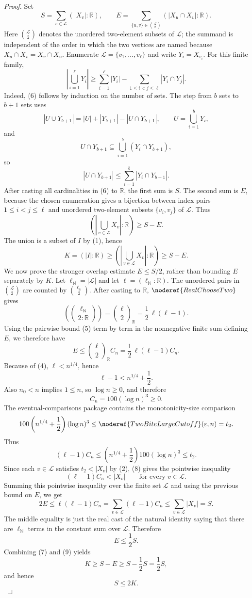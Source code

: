 \begin{proof}
Set
\[
S=\sum_{v\in\mathcal L}(|X_v|:\mathbb R),
\qquad
E=\sum_{\{u,v\}\in\binom{\mathcal L}{2}}
  (|X_u\cap X_v|:\mathbb R).
\]
Here \(\binom{\mathcal L}{2}\) denotes the unordered two-element subsets of
\(\mathcal L\); the summand is independent of the order in which the two
vertices are named because \(X_u\cap X_v=X_v\cap X_u\).
Enumerate \(\mathcal L=\{v_1,\ldots,v_\ell\}\) and write
\(Y_i=X_{v_i}\).  For this finite family,
\[
\left|\bigcup_{i=1}^{\ell}Y_i\right|
\ge
\sum_{i=1}^{\ell}|Y_i|
-
\sum_{1\le i<j\le \ell}|Y_i\cap Y_j|. \tag{6}
\]
Indeed, (6) follows by induction on the number of sets.  The step from
\(b\) sets to \(b+1\) sets uses
\[
|U\cup Y_{b+1}|=|U|+|Y_{b+1}|-|U\cap Y_{b+1}|,
\qquad U=\bigcup_{i=1}^{b}Y_i,
\]
and
\[
U\cap Y_{b+1}\subseteq
\bigcup_{i=1}^{b}(Y_i\cap Y_{b+1}),
\]
so
\[
|U\cap Y_{b+1}|
\le
\sum_{i=1}^{b}|Y_i\cap Y_{b+1}|.
\]
After casting all cardinalities in (6) to \(\mathbb R\), the first sum is
\(S\).  The second sum is \(E\), because the chosen enumeration gives a
bijection between index pairs \(1\le i<j\le\ell\) and unordered two-element
subsets \(\{v_i,v_j\}\) of \(\mathcal L\).  Thus
\[
\left(\left|\bigcup_{v\in\mathcal L}X_v\right|:\mathbb R\right)\ge S-E.
\]
The union is a subset of \(I\) by (1), hence
\[
K=(|I|:\mathbb R)\ge
\left(\left|\bigcup_{v\in\mathcal L}X_v\right|:\mathbb R\right)
\ge S-E. \tag{7}
\]
We now prove the stronger overlap estimate \(E\le S/2\), rather than bounding
\(E\) separately by \(K\).  Let \(\ell_{\mathbb N}=|\mathcal L|\) and let
\(\ell=(\ell_{\mathbb N}:\mathbb R)\).  The unordered pairs in
\(\binom{\mathcal L}{2}\) are counted by \(\ell_{\mathbb N}\choose 2\).  After
casting to \(\mathbb R\), \(\noderef{RealChooseTwo}\) gives
\[
(\ell_{\mathbb N}\choose 2:\mathbb R)
=\binom{\ell}{2}_{\mathbb R}
=\frac12\,\ell(\ell-1).
\]
Using the pairwise bound (5) term by term in the nonnegative finite sum
defining \(E\), we therefore have
\[
E\le \binom{\ell}{2}_{\mathbb R}C_n
=\frac12\,\ell(\ell-1)C_n.
\]
Because of (4), \(\ell<n^{1/4}\), hence
\[
\ell-1<n^{1/4}+\frac12.
\]
Also \(n_0<n\) implies \(1\le n\), so \(\log n\ge0\), and therefore
\[
C_n=100(\log n)^3\ge0.
\]
The eventual-comparisons package contains
the monotonicity-size comparison
\[
100\left(n^{1/4}+\frac12\right)(\log n)^3
\le \noderef{TwoBiteLargeCutoff}(\varepsilon,n)=t_2.
\]
Thus
\[
(\ell-1)C_n
\le \left(n^{1/4}+\frac12\right)100(\log n)^3
\le t_2. \tag{8}
\]
Since each \(v\in\mathcal L\) satisfies \(t_2<|X_v|\) by (2), (8) gives the
pointwise inequality
\[
(\ell-1)C_n<|X_v|
\qquad\text{for every }v\in\mathcal L.
\]
Summing this pointwise inequality over the finite set \(\mathcal L\) and using
the previous bound on \(E\), we get
\[
2E\le \ell(\ell-1)C_n
=\sum_{v\in\mathcal L}(\ell-1)C_n
\le \sum_{v\in\mathcal L}|X_v|=S.
\]
The middle equality is just the real cast of the natural identity saying that
there are \(\ell_{\mathbb N}\) terms in the constant sum over \(\mathcal L\).
Therefore
\[
E\le \frac12S. \tag{9}
\]
Combining (7) and (9) yields
\[
K\ge S-E\ge S-\frac12S=\frac12S,
\]
and hence
\[
S\le 2K. \tag{10}
\]


\end{proof}
